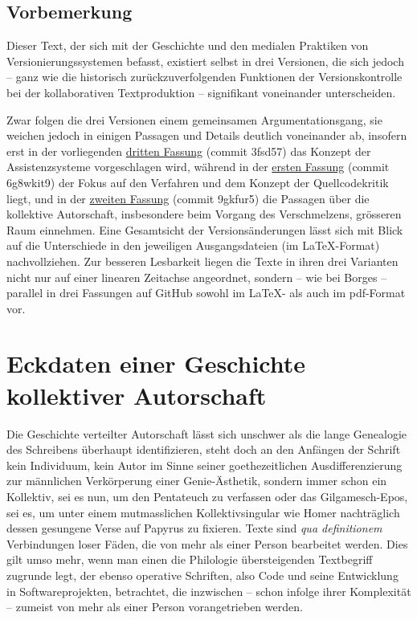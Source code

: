 \documentclass[a4paper,10pt]{article}
\begin{document}
\subsection*{Vorbemerkung}

Dieser Text, der sich mit der Geschichte und den medialen Praktiken von Versionierungssystemen befasst, existiert selbst in drei Versionen, die sich jedoch – ganz wie die historisch zurückzuverfolgenden Funktionen der Versionskontrolle bei der kollaborativen Textproduktion – signifikant voneinander unterscheiden. 

Zwar folgen die drei Versionen einem gemeinsamen Argumentationsgang, sie weichen jedoch in einigen Passagen und Details deutlich voneinander ab, insofern erst in der vorliegenden \href{https://github.com/nachsommer/VersionsKontrolle/tree/master/3.Fassung}{dritten Fassung} (commit 3fsd57) das Konzept der Assistenzsysteme vorgeschlagen wird, während in der \href{https://github.com/nachsommer/VersionsKontrolle/tree/master/1.Fassung}{ersten Fassung} (commit 6g8wkit9) der Fokus auf den Verfahren und dem Konzept der Quellcodekritik liegt, und in der \href{https://github.com/nachsommer/VersionsKontrolle/tree/master/2.Fassung}{zweiten Fassung} (commit 9gkfur5) die Passagen über die kollektive Autorschaft, insbesondere beim Vorgang des Verschmelzens, grösseren Raum einnehmen. Eine Gesamtsicht der Versionsänderungen lässt sich mit Blick auf die Unterschiede in den jeweiligen Ausgangsdateien (im \LaTeX-Format) nachvollziehen. Zur besseren Lesbarkeit liegen die Texte in ihren drei Varianten nicht nur auf einer linearen Zeitachse angeordnet, sondern – wie bei Borges – parallel in drei Fassungen auf GitHub sowohl im \LaTeX- als auch im pdf-Format vor.

\section[Eckdaten einer Geschichte kollektiver Autorschaft]{Eckdaten einer Geschichte\\ 
kollektiver Autorschaft}

\noindent Die Geschichte verteilter Autorschaft lässt sich unschwer als die lange Genealogie des Schreibens überhaupt identifizieren, steht doch an den Anfängen der Schrift kein Individuum, kein Autor im Sinne seiner goethezeitlichen Ausdifferenzierung zur männlichen Verkörperung einer Genie-Ästhetik, sondern immer schon ein Kollektiv, sei es nun, um den Pentateuch zu verfassen oder das Gilgamesch-Epos, sei es, um unter einem mut\-mass\-lichen Kollektivsingular wie Homer nachträglich dessen gesungene Verse auf Papyrus zu fixieren. Texte sind \emph{qua definitionem} Verbindungen loser Fäden, die von mehr als einer Person bearbeitet werden. Dies gilt umso mehr, wenn man einen die Philologie übersteigenden Textbegriff zugrunde legt, der ebenso operative Schriften, also Code und seine Entwicklung in Softwareprojekten, betrachtet, die inzwischen – schon infolge ihrer Komplexität – zumeist von mehr als einer Person vorangetrieben werden. 
\end{document}
